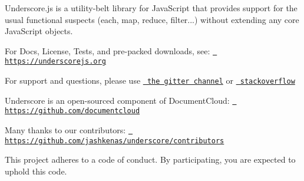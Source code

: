 Underscore.\+js is a utility-\/belt library for Java\+Script that provides support for the usual functional suspects (each, map, reduce, filter...) without extending any core Java\+Script objects.

For Docs, License, Tests, and pre-\/packed downloads, see\+: \href{https://underscorejs.org}{\texttt{ https\+://underscorejs.\+org}}

For support and questions, please use \href{https://gitter.im/jashkenas/underscore}{\texttt{ the gitter channel}} or \href{https://stackoverflow.com/search?q=underscore.js}{\texttt{ stackoverflow}}

Underscore is an open-\/sourced component of Document\+Cloud\+: \href{https://github.com/documentcloud}{\texttt{ https\+://github.\+com/documentcloud}}

Many thanks to our contributors\+: \href{https://github.com/jashkenas/underscore/contributors}{\texttt{ https\+://github.\+com/jashkenas/underscore/contributors}}

This project adheres to a code of conduct. By participating, you are expected to uphold this code. 